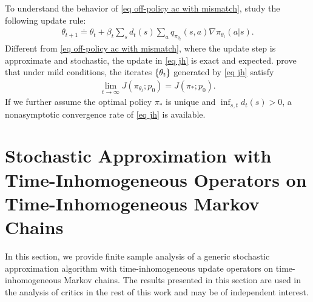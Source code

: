 \documentclass[twoside,11pt]{article}
\numberwithin{assucounter}{section}
\begin{document}
To understand the behavior of \eqref{eq off-policy ac with mismatch},
\citet{laroche2021dr} study the following update rule:
\begin{align}
  \label{eq jh}
  \theta_{t+1} \doteq \theta_t + \beta_t \sum_s d_t(s) \sum_{a}q_{\pi_{\theta_t}}(s, a) \nabla \pi_{\theta_t}(a|s).
\end{align}
Different from \eqref{eq off-policy ac with mismatch},
where the update step is approximate and stochastic,
the update in \eqref{eq jh} is exact and expected.
\citet{laroche2021dr} prove that under mild conditions, 
the iterates $\qty{\theta_t}$ generated by \eqref{eq jh} satisfy
\begin{align}
  \lim_{t\to\infty} J(\pi_{\theta_t};p_0) = J(\pi_*; p_0).
\end{align}
If we further assume the optimal policy $\pi_*$ is unique and $\inf_{s, t} d_t(s) > 0$,
a nonasymptotic convergence rate of \eqref{eq jh} is available.

\section{Stochastic Approximation with Time-Inhomogeneous Operators on Time-Inhomogeneous Markov Chains}
\label{sec sa}
In this section,
we provide finite sample analysis of a generic stochastic approximation algorithm with time-inhomogeneous update operators on time-inhomogeneous Markov chains.
The results presented in this section are used in the analysis of critics in the rest of this work
and may be of independent interest. 
\end{document}
